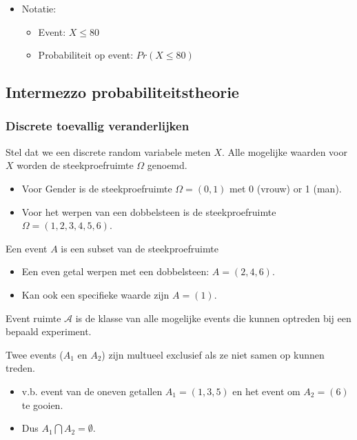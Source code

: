\documentclass[
  12pt,dutch,coursenotes]{book}
\providecommand{\tightlist}{%
  \setlength{\itemsep}{0pt}\setlength{\parskip}{0pt}}
\theoremstyle{definition}
\theoremstyle{definition}
\theoremstyle{definition}
\theoremstyle{definition}
\theoremstyle{remark}
\begin{document}
\begin{itemize}
\item
  Notatie:

  \begin{itemize}
  \tightlist
  \item
    Event: \(X \leq 80\)
  \item
    Probabiliteit op event: \(Pr(X \leq 80)\)
  \end{itemize}
\end{itemize}

\hypertarget{intermezzo-probabiliteitstheorie}{%
\subsection{Intermezzo probabiliteitstheorie}\label{intermezzo-probabiliteitstheorie}}

\hypertarget{discrete-toevallig-veranderlijken}{%
\subsubsection{Discrete toevallig veranderlijken}\label{discrete-toevallig-veranderlijken}}

Stel dat we een discrete random variabele meten \(X\). Alle mogelijke waarden voor \(X\) worden de steekproefruimte \(\Omega\) genoemd.

\begin{itemize}
\item
  Voor Gender is de steekproefruimte \(\Omega=(0,1)\) met 0 (vrouw) or 1 (man).
\item
  Voor het werpen van een dobbelsteen is de steekproefruimte \(\Omega=(1,2,3,4,5,6)\).
\end{itemize}

Een event \(A\) is een subset van de steekproefruimte

\begin{itemize}
\tightlist
\item
  Een even getal werpen met een dobbelsteen: \(A=(2,4,6)\).
\item
  Kan ook een specifieke waarde zijn \(A=(1)\).
\end{itemize}

Event ruimte \(\mathcal{A}\) is de klasse van alle mogelijke events die kunnen optreden bij een bepaald experiment.

Twee events (\(A_1\) en \(A_2\)) zijn multueel exclusief als ze niet samen op kunnen treden.

\begin{itemize}
\tightlist
\item
  v.b. event van de oneven getallen \(A_1=(1,3,5)\) en het event om \(A_2=(6)\) te gooien.
\item
  Dus \(A_1 \bigcap A_2=\emptyset\).
\end{itemize}
\end{document}
